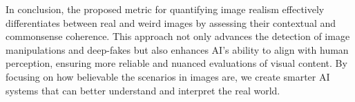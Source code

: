 \documentclass[11pt]{article}
\begin{document}
In conclusion, the proposed metric for quantifying image realism effectively differentiates between real and weird images by assessing their contextual and commonsense coherence. This approach not only advances the detection of image manipulations and deep-fakes but also enhances AI's ability to align with human perception, ensuring more reliable and nuanced evaluations of visual content. By focusing on how believable the scenarios in images are, we create smarter AI systems that can better understand and interpret the real world.

%




\end{document}
